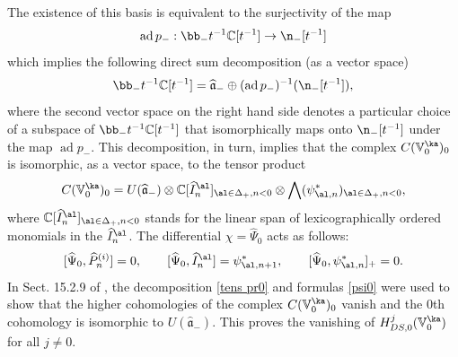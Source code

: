 \documentclass{amsart}
\newcommand{\V}{\mathbb{V}}
\newcommand{\wh}{\widehat}
\newcommand{\on}{\operatorname}
\newcommand{\+}{\mathop{\oplus}}
\renewcommand{\*}{{\otimes}}
\newcommand{\mb}{\mathbb}
\newcommand{\C}{\mathbb{C}}
\theoremstyle{theorem}
\theoremstyle{remark}
\numberwithin{equation}{section}
\begin{document}
The existence of this basis is equivalent to the surjectivity of the map
\begin{equation}    \label{surj map0}
\on{ad} p_-: \bb_- t^{-1}\C[t^{-1}] \to \n_-[t^{-1}]
\end{equation}
which implies the following direct sum decomposition (as a
vector space)
\begin{equation} \label{decomp0} \bb_- t^{-1}\C[t^{-1}] =
  \wh{\mathfrak a}_- \oplus (\on{ad} p_-)^{-1}(\n_-[t^{-1}]),
\end{equation}
where the second vector space on the right hand side denotes a
particular choice of a subspace of $\bb_- t^{-1}\C[t^{-1}]$ that
isomorphically maps onto $\n_-[t^{-1}]$ under the map $\on{ad}
p_-$. This decomposition, in turn, implies that the complex $C({\mb
  V}^\ka_0)_0$ is isomorphic, as a vector space, to the tensor product
\begin{equation}    \label{tens pr0}
C({\mb V}^\ka_0)_0 =
  U(\wh{\mathfrak a}_-) \otimes \C[\wh{I}^\al_n]_{\al \in \Delta_+, n<0}
  \otimes \bigwedge(\psi^*_{\al,n})_{\al \in \Delta_+, n<0},
\end{equation}
where $\C[\wh{I}^\al_n]_{\al \in \Delta_+, n<0}$ stands for the linear span
of lexicographically ordered monomials in the $\wh{I}^\al_n$. The
differential $\chi = \wh\Psi_0$ acts as follows:
\begin{equation}    \label{psi0}
[\wh\Psi_0,\wh{P}^{(i)}_n] = 0, \qquad [\wh\Psi_0,\wh{I}^{\al}_n] =
  \psi^*_{\al,n+1}, \qquad [\wh\Psi_0,\psi^*_{\al,n}]_+=0.
\end{equation}
In Sect. 15.2.9 of \cite{FreBen04}, the decomposition \eqref{tens pr0}
and formulas \eqref{psi0} were used to show that the higher
cohomologies of the complex $C({\mb V}^\ka_0)_0$ vanish and the $0$th
cohomology is isomorphic to $U(\wh{\mathfrak a}_-)$. This proves the
vanishing of $H^j_{DS,0}(\V^\ka_0)$ for all $j \neq 0$.
\end{document}
